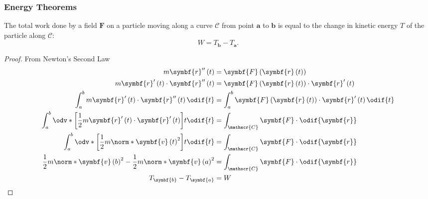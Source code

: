 \documentclass{article}
\begin{document}
\subsubsection{Energy Theorems}
\begin{theorem}
    The total work done by a field \(\symbf{F}\) on a particle moving
    along a curve \(\mathscr{C}\) from point \(\symbf{a}\) to \(\symbf{b}\)
    is equal to the change in kinetic energy \(T\) of the particle along
    \(\mathscr{C}\):
    \begin{equation*}
        W = T_{\symbf{b}} - T_{\symbf{a}}.
    \end{equation*}
\end{theorem}
\begin{proof}
    From Newton's Second Law
    \begin{align*}
        m \symbf{r}''\left( t \right)                                                                                        & = \symbf{F}\left( \symbf{r}\left( t \right) \right)                                                    \\
        m \symbf{r}'\left( t \right) \cdot \symbf{r}''\left( t \right)                                                       & = \symbf{F}\left( \symbf{r}\left( t \right) \right) \cdot \symbf{r}'\left( t \right)                   \\
        \int_a^b m \symbf{r}'\left( t \right) \cdot \symbf{r}''\left( t \right) \odif{t}                                     & = \int_a^b \symbf{F}\left( \symbf{r}\left( t \right) \right) \cdot \symbf{r}'\left( t \right) \odif{t} \\
        \int_a^b \odv*{\left[ \frac{1}{2} m \symbf{r}'\left( t \right) \cdot \symbf{r}'\left( t \right) \right]}{t} \odif{t} & = \int_{\mathscr{C}} \symbf{F} \cdot \odif{\symbf{r}}                                                  \\
        \int_a^b \odv*{\left[ \frac{1}{2} m \norm*{\symbf{v}\left( t \right)}^2 \right]}{t} \odif{t}                         & = \int_{\mathscr{C}} \symbf{F} \cdot \odif{\symbf{r}}                                                  \\
        \frac{1}{2} m \norm*{\symbf{v}\left( b \right)}^2 - \frac{1}{2} m \norm*{\symbf{v}\left( a \right)}^2                & = \int_{\mathscr{C}} \symbf{F} \cdot \odif{\symbf{r}}                                                  \\
        T_{\symbf{b}} - T_{\symbf{a}}                                                                                        & = W
    \end{align*}
\end{proof}
\end{document}
